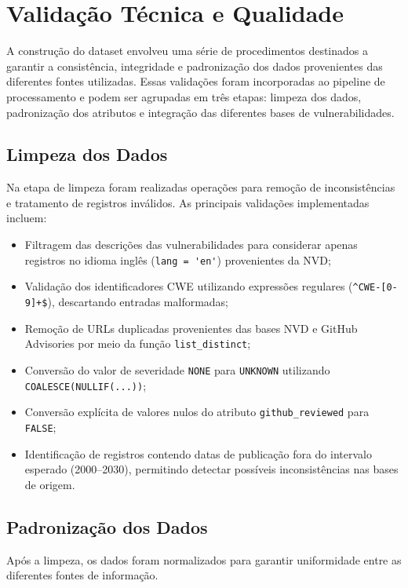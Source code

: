 \section{Validação Técnica e Qualidade}

A construção do dataset envolveu uma série de procedimentos destinados a garantir a consistência, integridade e padronização dos dados provenientes das diferentes fontes utilizadas. Essas validações foram incorporadas ao pipeline de processamento e podem ser agrupadas em três etapas: limpeza dos dados, padronização dos atributos e integração das diferentes bases de vulnerabilidades.

\subsection{Limpeza dos Dados}

Na etapa de limpeza foram realizadas operações para remoção de inconsistências e tratamento de registros inválidos. As principais validações implementadas incluem:

\begin{itemize}
\item Filtragem das descrições das vulnerabilidades para considerar apenas registros no idioma inglês (\verb|lang = 'en'|) provenientes da NVD;
\item Validação dos identificadores CWE utilizando expressões regulares (\verb|^CWE-[0-9]+$|), descartando entradas malformadas;
\item Remoção de URLs duplicadas provenientes das bases NVD e GitHub Advisories por meio da função \verb|list_distinct|;
\item Conversão do valor de severidade \verb|NONE| para \verb|UNKNOWN| utilizando \verb|COALESCE(NULLIF(...))|;
\item Conversão explícita de valores nulos do atributo \verb|github_reviewed| para \verb|FALSE|;
\item Identificação de registros contendo datas de publicação fora do intervalo esperado (2000--2030), permitindo detectar possíveis inconsistências nas bases de origem.
\end{itemize}

\subsection{Padronização dos Dados}

Após a limpeza, os dados foram normalizados para garantir uniformidade entre as diferentes fontes de informação.

